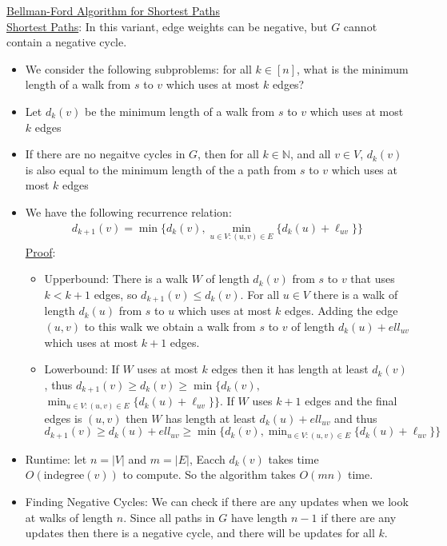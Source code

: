 \documentclass{article}
\begin{document}
\underline{Bellman-Ford Algorithm for Shortest Paths} \\[1.0ex]
\underline{Shortest Paths}: In this variant, edge weights can be negative, but $G$ cannot contain a negative cycle. 
\begin{itemize}
    \item We consider the following subproblems: for all $k \in [n]$, what is the minimum length of a walk from $s$ to $v$ which uses at most $k$ edges? 
    \item Let $d_k(v)$ be the minimum length of a walk from $s$ to $v$ which uses at most $k$ edges 
    \item If there are no negaitve cycles in $G$, then for all $k \in \mathbb{N}$, and all $v \in V$, $d_k(v)$ is also equal to the minimum length of the a path from $s$ to $v$ which uses at most $k$ edges 
    \item We have the following recurrence relation: \begin{align*}
        d_{k + 1}(v) = \min\{d_k(v), \min_{u\in V : (u, v) \in E} \{d_k(u) + \ell_{uv}\}\}
    \end{align*} 
    \underline{Proof}: \begin{itemize}
        \item Upperbound: There is a walk $W$ of length $d_k(v)$ from $s$ to $v$ that uses $k < k + 1$ edges, so $d_{k + 1}(v) \leq d_k(v)$. For all $u \in V$ there is a walk of length $d_k(u)$ from $s$ to $u$ which uses at most $k$ edges. Adding the edge $(u, v)$ to this walk we obtain a walk from $s$ to $v$ of length $d_k(u) + ell_{uv}$ which uses at most $k + 1$ edges.
        \item Lowerbound: If $W$ uses at most $k$ edges then it has length at least $d_k(v)$, thus $d_{k + 1}(v) \geq d_k(v) \geq \min\{d_k(v),$ \\ $ \min_{u\in V : (u, v) \in E} \{d_k(u) + \ell_{uv}\}\}$. If $W$ uses $k + 1$ edges and the final edges is $(u, v)$ then $W$ has length at least $d_k(u) + ell_{uv}$ and thus $d_{k + 1}(v) \geq d_k(u) + ell_{uv} \geq \min\{d_k(v), \min_{u\in V : (u, v) \in E} \{d_k(u) + \ell_{uv}\}\}$
     \end{itemize}
     \item Runtime: let $n = |V|$ and $m = |E|$, Eacch $d_k(v)$ takes time $O(\text{indegree}(v))$ to compute. So the algorithm takes $O(mn)$ time.
     \item Finding Negative Cycles: We can check if there are any updates when we look at walks of length $n$. Since all paths in $G$ have length $n - 1$ if there are any updates then there is a negative cycle, and there will be updates for all $k$.
\end{itemize}
\end{document}
